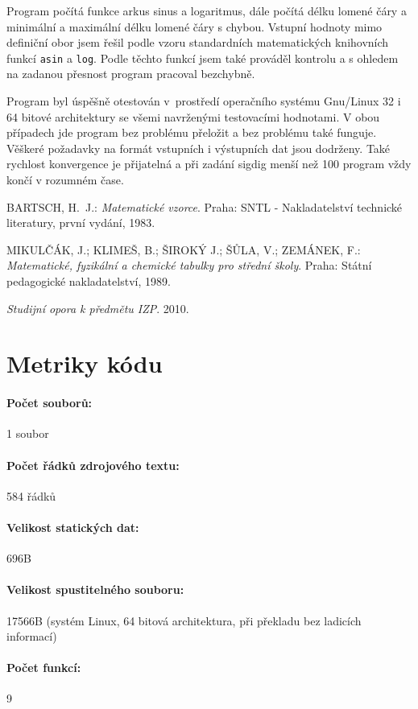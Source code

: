 \documentclass[12pt,a4paper,titlepage,final]{article}
\begin{document}
Program počítá funkce arkus sinus a logaritmus, dále počítá délku lomené čáry
a minimální a maximální délku lomené čáry s chybou. Vstupní hodnoty mimo
definiční obor jsem řešil podle vzoru standardních matematických
knihovních funkcí \texttt{asin} a \texttt{log}. Podle těchto funkcí jsem
také prováděl kontrolu a s ohledem na zadanou přesnost program pracoval
bezchybně.

Program byl úspěšně otestován v~prostředí operačního systému Gnu/Linux
32 i 64 bitové architektury se všemi navrženými testovacími hodnotami.
V obou případech jde program bez problému přeložit a bez problému
také funguje. Věškeré požadavky na formát vstupních i výstupních dat
jsou dodrženy. Také rychlost konvergence je přijatelná a při zadání sigdig
menší než 100 program vždy končí v rozumném čase.

\begin{thebibliography}{1}

BARTSCH, H.~J.: \emph{Matematické vzorce}.
Praha: SNTL - Nakladatelství technické literatury, první vydání, 1983.

MIKULČÁK, J.; KLIMEŠ, B.; ŠIROKÝ J.; ŠŮLA, V.; ZEMÁNEK, F.:
\emph{Matematické, fyzikální a chemické tabulky pro střední školy}.
Praha: Státní pedagogické nakladatelství, 1989.

\emph{Studijní opora k předmětu IZP}.
2010.

\end{thebibliography}
\appendix

\section{Metriky kódu} \label{metriky}
\paragraph{Počet souborů:} 1 soubor
\paragraph{Počet řádků zdrojového textu:} 584 řádků
\paragraph{Velikost statických dat:} 696B
\paragraph{Velikost spustitelného souboru:} 17566B (systém Linux, 64 bitová
architektura, při překla\-du bez ladicích informací)
\paragraph{Počet funkcí:} 9
\end{document}
